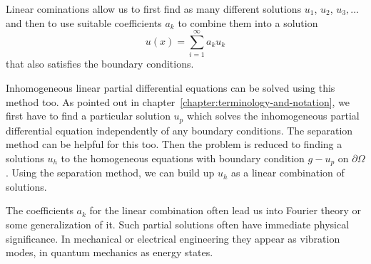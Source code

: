 Linear cominations allow us to first find as many different solutions
$u_1$, $u_2$, $u_3,\dots$ and then to use suitable coefficients $a_k$
to combine them into a solution
\[
u(x)=\sum_{i=1}^\infty a_ku_k
\]
that also satisfies the boundary conditions.

Inhomogeneous linear partial differential equations can be solved using
this method too.
As pointed out in chapter~\ref{chapter:terminology-and-notation},
we first have to find a particular solution $u_p$ which solves the
inhomogeneous partial differential equation independently
of any boundary conditions.
The separation method can be helpful for this too.
Then the problem is reduced to finding a solutions $u_h$ to the homogeneous
equations with boundary condition $g-u_p$ on $\partial\Omega$.
Using the separation method, we can build up $u_h$ as a linear combination
of solutions.

The coefficients $a_k$ for the linear combination often lead us into
Fourier theory or some generalization of it.
Such partial solutions often have immediate physical significance.
In mechanical or electrical engineering they appear as vibration modes,
in quantum mechanics as energy states.


